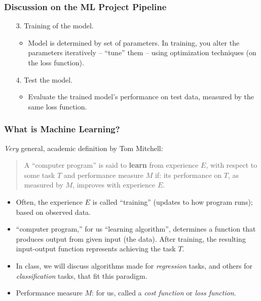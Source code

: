 \documentclass{beamer}
\theoremstyle{example}
\newcommand{\gnum}[1]{{\color{mygreen}#1.}}
\begin{document}
\begin{frame}
\frametitle{Discussion on the ML Project Pipeline}
    \begin{enumerate}
        \item[\gnum{3}] Training of the model.
        \begin{itemize}
            \item Model is determined by set of parameters. In training, you alter the parameters iteratively {--} ``tune'' them {--} using optimization techniques (on the loss function).
        \end{itemize}
        \item[\gnum{4}] Test the model.
        \begin{itemize}
            \item Evaluate the trained model's performance on test data, measured by the same loss function.
        \end{itemize}
    \end{enumerate}
\end{frame}

\begin{frame}
\frametitle{What is Machine Learning?}
    \textit{Very} general, academic definition by Tom Mitchell:\newline 
    \begin{quote}
        A ``computer program'' is said to \textbf{learn} from experience $E$, with respect to some task $T$ and performance measure $M$ if: its performance on $T$, as measured by $M$, improves with experience $E$.
    \end{quote}
    \vspace*{-12pt}
    \pause
    \begin{itemize}
        \item Often, the experience $E$ is called ``training'' (updates to how program runs); based on observed data.
        \pause
        \item ``computer program,'' for us ``learning algorithm'', determines a function that produces output from given input (the data). After training, the resulting input-output function represents achieving the task $T$. 
        \pause
        \item In class, we will discuss algorithms made for \textit{regression} tasks, and others for \textit{classification} tasks, that fit this paradigm.
        \pause 
        \item Performance measure $M$: for us, called a \textit{cost function} or \textit{loss function}.
    \end{itemize}

\end{frame}
\end{document}
